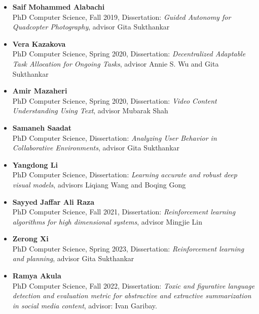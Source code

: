\begin{itemize}
\item\textbf{Saif Mohammed Alabachi} \\
PhD Computer Science, Fall 2019, Dissertation: {\em Guided Autonomy for Quadcopter Photography}, advisor Gita Sukthankar

\item\textbf{Vera Kazakova} \\
PhD Computer Science, Spring 2020, Dissertation: {\em Decentralized Adaptable Task Allocation for Ongoing Tasks}, advisor Annie S. Wu and Gita Sukthankar

\item\textbf{Amir Mazaheri} \\
PhD Computer Science, Spring 2020, Dissertation: {\em Video Content Understanding Using Text}, advisor Mubarak Shah

\item\textbf{Samaneh Saadat} \\
PhD Computer Science, Dissertation: {\em Analyzing User Behavior in Collaborative Environments}, advisor Gita Sukthankar


\item\textbf{Yangdong Li} \\
PhD Computer Science, Dissertation: {\em Learning accurate and robust deep visual models}, advisors Liqiang Wang and Boqing Gong

\item\textbf{Sayyed Jaffar Ali Raza} \\
PhD Computer Science, Fall 2021, Dissertation: {\em Reinforcement learning algorithms for high dimensional systems}, advisor Mingjie Lin

\item\textbf{Zerong Xi} \\
PhD Computer Science, Spring 2023, Dissertation: {\em Reinforcement learning and planning}, advisor Gita Sukthankar

\item\textbf{Ramya Akula} \\
PhD Computer Science, Fall 2022, Dissertation: {\em Toxic and figurative language detection and evaluation metric for abstractive and extractive summarization in social media content}, advisor: Ivan Garibay.


\end{itemize}
